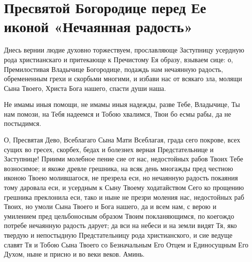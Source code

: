 \section{Пресвятой Богородице перед Ее иконой «Нечаянная радость»}\begin{mymulticols}


Днесь вернии людие духовно торжествуем, прославляюще Заступницу усердную рода христианскаго и притекающе к Пречистому Ея образу, взываем сице: о, Премилостивая Владычице Богородице, подаждь нам нечаянную радость, обремененным грехи и скорбьми многими, и избави нас от всякаго зла, молящи Сына Твоего, Христа Бога нашего, спасти души наша. 


Не имамы иныя помощи, не имамы иныя надежды, разве Тебе, Владычице, Ты нам помози, на Тебя надеемся и Тобою хвалимся, Твои бо есмы рабы, да не постыдимся. 


О, Пресвятая Дево, Всеблагаго Сына Мати Всеблагая, града сего покрове, всех сущих во гресех, скорбех, бедах и болезнех верная Предстательнице и Заступнице! Приими молебное пение сие от нас, недостойных рабов Твоих Тебе возносимое; и якоже древле грешника, на всяк день многажды пред честною иконою Твоею молившагося, не презрела еси, но нечаянную радость покаяния тому даровала еси, и усердным к Сыну Твоему ходатайством Сего ко прощению грешника преклонила еси, тако и ныне не презри моления нас, недостойных раб Твоих, но умоли Сына Твоего и Бога нашего, да и всем нам, с верою и умилением пред цельбоносным образом Твоим покланяющимся, по коегождо потребе нечаянную радость дарует; да вси на небеси и на земли видят Тя, яко твердую и непостыдную Предстательницу рода христианского, и сие ведуще славят Тя и Тобою Сына Твоего со Безначальным Его Отцем и Единосущным Его Духом, ныне и присно и во веки веков. Аминь.

\end{mymulticols}

\mychapterending


